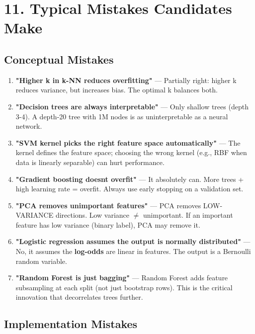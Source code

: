 \documentclass[11pt]{article}
\begin{document}
\section{11. Typical Mistakes Candidates Make}\label{11-typical-mistakes-candidates-make}

\subsection{Conceptual Mistakes}\label{conceptual-mistakes}

\begin{enumerate}
\def\labelenumi{\arabic{enumi}.}
\item
  \textbf{"Higher k in k-NN reduces overfitting"} --- Partially right: higher k reduces variance, but increases bias. The optimal k balances both.
\item
  \textbf{"Decision trees are always interpretable"} --- Only shallow trees (depth 3-4). A depth-20 tree with 1M nodes is as uninterpretable as a neural network.
\item
  \textbf{"SVM kernel picks the right feature space automatically"} --- The kernel defines the feature space; choosing the wrong kernel (e.g., RBF when data is linearly separable) can hurt performance.
\item
  \textbf{"Gradient boosting doesn\textquotesingle t overfit"} --- It absolutely can. More trees + high learning rate = overfit. Always use early stopping on a validation set.
\item
  \textbf{"PCA removes unimportant features"} --- PCA removes LOW-VARIANCE directions. Low variance \(\neq\) unimportant. If an important feature has low variance (binary label), PCA may remove it.
\item
  \textbf{"Logistic regression assumes the output is normally distributed"} --- No, it assumes the \textbf{log-odds} are linear in features. The output is a Bernoulli random variable.
\item
  \textbf{"Random Forest is just bagging"} --- Random Forest adds feature subsampling at each split (not just bootstrap rows). This is the critical innovation that decorrelates trees further.
\end{enumerate}

\subsection{Implementation Mistakes}\label{implementation-mistakes}
\end{document}
